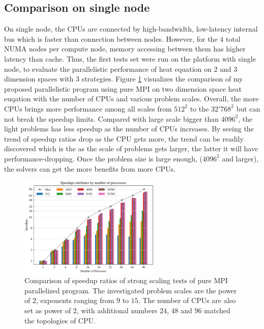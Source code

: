 \subsection{Comparison on single node}
On single node, the CPUs are connected by high-bandwidth, low-latency internal bus which is faster than connection between nodes.
However, for the $4$ total NUMA nodes per compute node, memory accessing between them has higher latency than cache.
Thus, the first tests set were run on the platform with single node, to evaluate the parallelistic performance of heat equation on 2 and 3 dimension spaces with 
3 strategies.
Figure \ref{FIG:Benchmark:PURE_MPI} visualizes the comparison of my proposed parallelistic program using pure MPI on two dimension space heat euqation with 
the number of CPUs and various problem scales.
Overall, the more CPUs brings more performance among all scales from $512^2$ to the $32'768^2$ but can not break the speedup limits.
Compared with large scale bigger than $4096^2$, the light problems has less speedup as the number of CPUs increases.
By seeing the trend of speedup ratios drop as the CPU gets more, 
the trend can be readily discovered which is the as the scale of problems gets larger, the latter it will have performance-dropping.
Once the problem size is large enough, ($4096^2$ and larger), the solvers can get the more benefits from more CPUs.


\begin{figure}[htbp]
  \centering
  \includegraphics[width=0.6\textwidth]{figure/FIG_Benchmark_pure_mpi.pdf}
  \caption{
    Comparison of speedup ratios of strong scaling tests of pure MPI parallelized program. 
    The investigated problem scales are the power of $2$, exponents ranging from $9$ to $15$.
    The number of CPUs are also set as power of $2$, with additional numbers $24$, $48$ and $96$ matched the topologies of CPU.
  }
  \label{FIG:Benchmark:PURE_MPI}
\end{figure}

